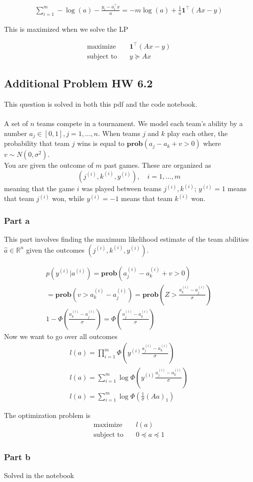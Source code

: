\begin{gather}
    \sum_{i=1}^m -\log (a) -\frac{y_i - a_i^\top x}{a} = -m \log(a) + \frac{1}{a}\textbf{1}^\top(Ax -y) 
\end{gather}

This is maximized when we solve the LP

\begin{align}
  \text{maximize} & \quad \textbf{1}^\top (Ax-y) \\
  \text{subject to} & \quad y \succeq Ax
\end{align}

\subsection{Additional Problem HW 6.2}
This question is solved in both this pdf and the code notebook.
\\ \\
A set of $n$ teams compete in a tournament. We model each team's ability by a number $a_j \in [0,1], j = 1, \dots, n$. When teams $j$ and $k$ play each other, the probability that team $j$ wins is equal to $\textbf{prob}(a_j - a_k + v > 0)$ where $v \sim N(0, \sigma^2)$. \\
You are given the outcome of $m$ past games. These are organized as
\begin{equation}
    (j^{(i)}, k^{(i)}, y^{(i)}), \quad i = 1, \dots, m
\end{equation}
meaning that the game $i$ was played between teams $j^{(i)}, k^{(i)}$; $y^{(i)}=1$ means that team $j^{(i)}$ won, while $y^{(i)}=-1$ means that team $k^{(i)}$ won.
\subsubsection{Part a}
This part involves finding the maximum likelihood estimate of the team abilities $\hat{a} \in \mathbb{R}^n$ given the outcomes  $(j^{(i)}, k^{(i)}, y^{(i)})$.

\begin{gather}
    p(y^{(i)} | a^{(i)}) = \textbf{prob} (a_j^{(i)} - a_k^{(i)} + v > 0) \\
    = \textbf{prob} (v > a_k^{(i)} - a_j^{(i)}) =  \textbf{prob} (Z > \frac{a_k^{(i)} - a_j^{(i)}}{\sigma}) \\
    1 - \Phi (\frac{a_k^{(i)} - a_j^{(i)}}{\sigma}) = \Phi (\frac{a_j^{(i)} - a_k^{(i)}}{\sigma})
\end{gather}
Now we  want to go over all outcomes
\begin{gather}
    l(a) = \prod_{i=1}^{m} \Phi (y^{(i)}\frac{a_j^{(i)} - a_k^{(i)}}{\sigma}) \\
    l(a) = \sum_{i=1}^{m} \log \Phi (y^{(i)}\frac{a_j^{(i)} - a_k^{(i)}}{\sigma}) \\
    l(a) = \sum_{i=1}^{m} \log \Phi (\frac{1}{\sigma} (Aa)_1)
\end{gather}

The optimization problem is
\begin{align}
  \text{maximize} & \quad l(a) \\
  \text{subject to} & \quad  0 \preceq a \preceq 1
\end{align}

\subsubsection{Part b}
Solved in the notebook
